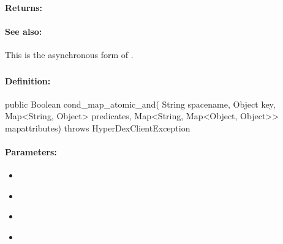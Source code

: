 \paragraph{Returns:}


\paragraph{See also:}  This is the asynchronous form of .

\pagebreak
\subsubsection{}
\label{api:java:cond_map_atomic_and}


\paragraph{Definition:}
\begin{javacode}
public Boolean cond_map_atomic_and(
        String spacename,
        Object key,
        Map<String, Object> predicates,
        Map<String, Map<Object, Object>> mapattributes) throws HyperDexClientException
\end{javacode}

\paragraph{Parameters:}
\begin{itemize}[noitemsep]
\item {}\\

\item {}\\

\item {}\\

\item {}\\

\end{itemize}

